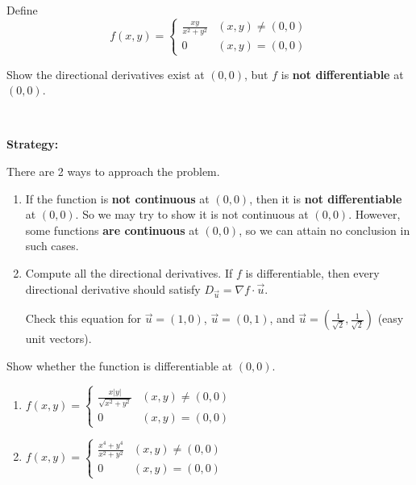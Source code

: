 \documentclass[11pt,fleqn]{book} %
\begin{document}
\begin{exercise}
    Define $$f(x, y) = \begin{cases}
        \frac{xy}{x^2 + y^2} & (x, y) \neq (0, 0) \\
        0                    & (x, y) = (0, 0)
    \end{cases}$$

    Show the directional derivatives exist at $(0, 0)$, but $f$ is \textbf{not differentiable} at $(0, 0)$.

    {~~~}

    \textbf{Strategy:}
    
    There are 2 ways to approach the problem.

    \begin{enumerate}
        \item If the function is \textbf{not continuous} at $(0, 0)$, then it is \textbf{not differentiable} at $(0, 0)$. So we may try to show it is not continuous at $(0, 0)$. However, some functions \textbf{are continuous} at $(0, 0)$, so we can attain no conclusion in such cases.

        \item Compute all the directional derivatives. If $f$ is differentiable, then every directional derivative should satisfy $D_{\vec{u}} = \nabla f \cdot \vec{u}$. 
        
        Check this equation for $\vec{u} = (1, 0)$, $\vec{u} = (0, 1)$, and $\vec{u} = \left( \frac{1}{\sqrt{2}}, \frac{1}{\sqrt{2}} \right)$ (easy unit vectors). 
    \end{enumerate}
\end{exercise}

\begin{exercise}
    Show whether the function is differentiable at $(0, 0)$.

    \begin{enumerate}[label=\alph*)]
        \item $f(x, y) = \begin{cases}
            \frac{x|y|}{\sqrt{x^2 + y^2}} & (x, y) \neq (0, 0) \\
            0                             & (x, y) = (0, 0)
        \end{cases}$

        \item $f(x, y) = \begin{cases}
            \frac{x^4 + y^4}{x^2 + y^2} & (x, y) \neq (0, 0) \\
            0                           & (x, y) = (0, 0)
        \end{cases}$
    \end{enumerate}
\end{exercise}
\end{document}
